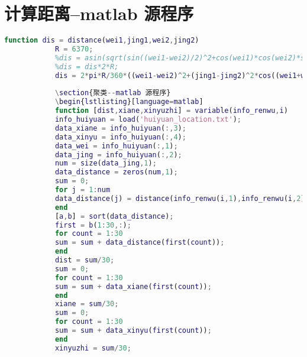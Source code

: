 \documentclass[withoutpreface,bwprint]{cumcmthesis} %
\begin{document}
			\section{计算距离--matlab 源程序}
			\begin{lstlisting}[language=matlab]
			function dis = distance(wei1,jing1,wei2,jing2)
			R = 6370;
			%dis = asin(sqrt(sin((wei1-wei2)/2)^2+cos(wei1)*cos(wei2)*sin((jing1-jing2)/2)^2));
			%dis = dis*2*R;
			dis = 2*pi*R/360*((wei1-wei2)^2+(jing1-jing2)^2*cos((wei1+wei2)/2)^2)^0.5;
			
			\section{聚类--matlab 源程序}
			\begin{lstlisting}[language=matlab]
			function [dist,xiane,xinyuzhi] = variable(info_renwu,i)
			info_huiyuan = load('huiyuan_location.txt');
			data_xiane = info_huiyuan(:,3);
			data_xinyu = info_huiyuan(:,4);
			data_wei = info_huiyuan(:,1);
			data_jing = info_huiyuan(:,2);
			num = size(data_jing,1);
			data_distance = zeros(num,1);
			sum = 0;
			for j = 1:num
			data_distance(j) = distance(info_renwu(i,1),info_renwu(i,2),info_huiyuan(j,1),info_huiyuan(j,2));
			end
			[a,b] = sort(data_distance);
			first = b(1:30,:);
			for count = 1:30
			sum = sum + data_distance(first(count));
			end
			dist = sum/30;
			sum = 0;
			for count = 1:30
			sum = sum + data_xiane(first(count));
			end
			xiane = sum/30;
			sum = 0;
			for count = 1:30
			sum = sum + data_xinyu(first(count));
			end
			xinyuzhi = sum/30;
			
			\end{lstlisting}
			
			
			
			
			
			
		
\end{document}
